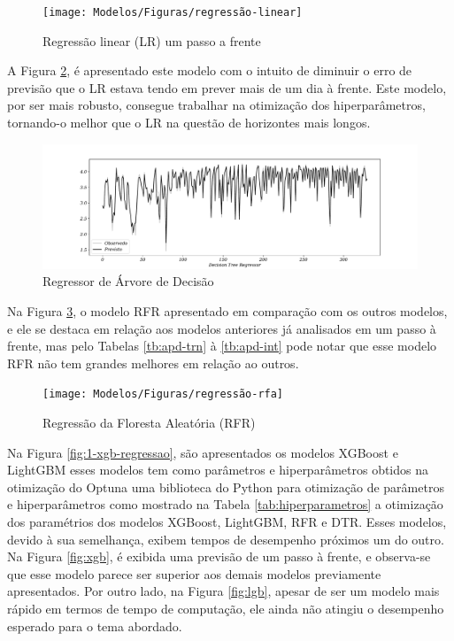 \begin{figure}[H]
	\centering
	\caption{Regressão linear (LR) um passo a frente}
	\label{fig:1-regressao-linear}
	\texttt{[image: Modelos/Figuras/regressão-linear]}
	
	
\end{figure}

A Figura \ref{fig:decision-tree-regressor}, é apresentado este modelo com o intuito de diminuir o erro de previsão que o LR estava tendo em prever mais de um dia à frente. Este modelo, por ser mais robusto, consegue trabalhar na otimização dos hiperparâmetros, tornando-o melhor que o LR na questão de horizontes mais longos.

\begin{figure}[H]
	\centering
	\caption{Regressor de \'Arvore de Decis\~ao }\label{fig:decision-tree-regressor}
	\includegraphics[width=1\linewidth]{Apendices/Figuras/modelagem-24h/Decision-Tree-Regressor}
	
	
\end{figure}

Na Figura \ref{fig:1-regressao-rfa}, o modelo RFR apresentado em comparação com os outros modelos, e ele se destaca em relação aos modelos anteriores já analisados em um passo à frente, mas pelo Tabelas \ref{tb:apd-trn} à \ref{tb:apd-int} pode notar que esse modelo RFR não tem grandes melhores em relação ao outros.


\begin{figure}[H]
	\centering
	\caption{Regressão da Floresta Aleatória (RFR)}
	\label{fig:1-regressao-rfa}
	\texttt{[image: Modelos/Figuras/regressão-rfa]}
	
	
\end{figure}

Na Figura \ref{fig:1-xgb-regressao}, são apresentados os modelos XGBoost e LightGBM esses modelos tem como parâmetros e hiperparâmetros obtidos na otimização do Optuna uma biblioteca do Python para otimização de parâmetros e hiperparâmetros como mostrado na Tabela \ref{tab:hiperparametros} a otimização dos paramétrios dos modelos XGBoost, LightGBM, RFR e DTR. Esses modelos, devido à sua semelhança, exibem tempos de desempenho próximos um do outro. Na Figura \ref{fig:xgb}, é exibida uma previsão de um passo à frente, e observa-se que esse modelo parece ser superior aos demais modelos previamente apresentados. Por outro lado, na Figura \ref{fig:lgb}, apesar de ser um modelo mais rápido em termos de tempo de computação, ele ainda não atingiu o desempenho esperado para o tema abordado.



